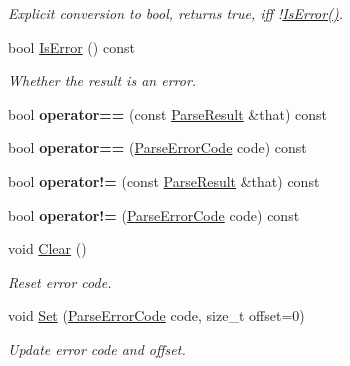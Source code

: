 \begin{DoxyCompactItemize}
\begin{DoxyCompactList}\small\item\em Explicit conversion to {\ttfamily bool}, returns {\ttfamily true}, iff !\hyperlink{structParseResult_a07c35a6769f5cb8a73cbc56c41e60a2a}{Is\+Error()}. \end{DoxyCompactList}\item 
bool \hyperlink{structParseResult_a07c35a6769f5cb8a73cbc56c41e60a2a}{Is\+Error} () const \hypertarget{structParseResult_a07c35a6769f5cb8a73cbc56c41e60a2a}{}\label{structParseResult_a07c35a6769f5cb8a73cbc56c41e60a2a}

\begin{DoxyCompactList}\small\item\em Whether the result is an error. \end{DoxyCompactList}\item 
bool {\bfseries operator==} (const \hyperlink{structParseResult}{Parse\+Result} \&that) const \hypertarget{structParseResult_a90794619408c295ffa923f3307526bed}{}\label{structParseResult_a90794619408c295ffa923f3307526bed}

\item 
bool {\bfseries operator==} (\hyperlink{group__RAPIDJSON__ERRORS_ga8d4b32dfc45840bca189ade2bbcb6ba7}{Parse\+Error\+Code} code) const \hypertarget{structParseResult_a5a0bd70f5bbb383ac63a6450ac4ae4d1}{}\label{structParseResult_a5a0bd70f5bbb383ac63a6450ac4ae4d1}

\item 
bool {\bfseries operator!=} (const \hyperlink{structParseResult}{Parse\+Result} \&that) const \hypertarget{structParseResult_a88c6357e3662c42081a99f77769671cf}{}\label{structParseResult_a88c6357e3662c42081a99f77769671cf}

\item 
bool {\bfseries operator!=} (\hyperlink{group__RAPIDJSON__ERRORS_ga8d4b32dfc45840bca189ade2bbcb6ba7}{Parse\+Error\+Code} code) const \hypertarget{structParseResult_a60309a39c413d7a300ae09e1fa9c7ddb}{}\label{structParseResult_a60309a39c413d7a300ae09e1fa9c7ddb}

\item 
void \hyperlink{structParseResult_a88b6d44f052a19e6436ae6aadc2c40b4}{Clear} ()\hypertarget{structParseResult_a88b6d44f052a19e6436ae6aadc2c40b4}{}\label{structParseResult_a88b6d44f052a19e6436ae6aadc2c40b4}

\begin{DoxyCompactList}\small\item\em Reset error code. \end{DoxyCompactList}\item 
void \hyperlink{structParseResult_aa81b4a7b776b77216cb752385203a8c1}{Set} (\hyperlink{group__RAPIDJSON__ERRORS_ga8d4b32dfc45840bca189ade2bbcb6ba7}{Parse\+Error\+Code} code, size\+\_\+t offset=0)\hypertarget{structParseResult_aa81b4a7b776b77216cb752385203a8c1}{}\label{structParseResult_aa81b4a7b776b77216cb752385203a8c1}

\begin{DoxyCompactList}\small\item\em Update error code and offset. \end{DoxyCompactList}\end{DoxyCompactItemize}
